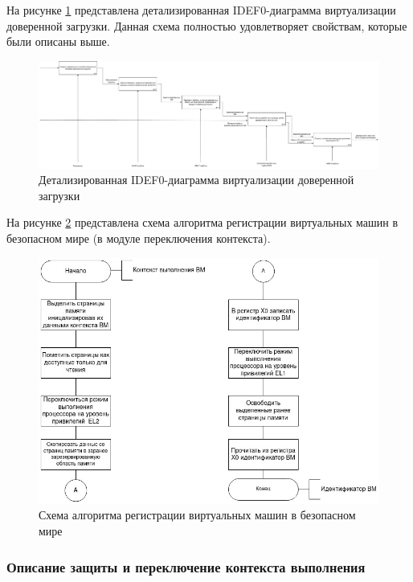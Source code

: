 На рисунке \ref{fig:idef0-secure-boot-2} представлена детализированная IDEF0-диаграмма виртуализации доверенной загрузки. Данная схема полностью удовлетворяет свойствам, которые были описаны выше.

\begin{figure}[h]
	\centering
	\includegraphics[width=\textwidth]{img/idef0-secure-boot-2.pdf}
	\caption{Детализированная IDEF0-диаграмма виртуализации доверенной загрузки}
	\label{fig:idef0-secure-boot-2}
\end{figure}

На рисунке \ref{fig:move-pte-algo} представлена схема алгоритма регистрации виртуальных машин в безопасном мире (в модуле переключения контекста).

\begin{figure}[h]
	\centering
	\includegraphics[scale=0.6]{img/algo_1.jpg}
	\caption{Схема алгоритма регистрации виртуальных машин в безопасном мире}
	\label{fig:move-pte-algo}
\end{figure}

\subsubsection{Описание защиты и переключение контекста выполнения}

